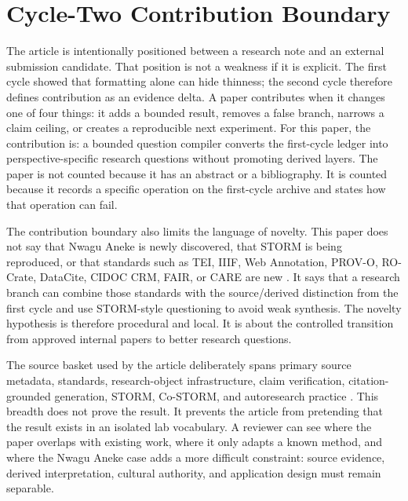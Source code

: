 \documentclass[sigconf,nonacm]{acmart}
\begin{document}
\section{Cycle-Two Contribution Boundary}
The article is intentionally positioned between a research note and an external
submission candidate. That position is not a weakness if it is explicit. The
first cycle showed that formatting alone can hide thinness; the second cycle
therefore defines contribution as an evidence delta. A paper contributes when it
changes one of four things: it adds a bounded result, removes a false branch,
narrows a claim ceiling, or creates a reproducible next experiment. For this
paper, the contribution is: a bounded question compiler converts the first-cycle ledger into perspective-specific research questions without promoting derived layers. The paper is not counted because it has an
abstract or a bibliography. It is counted because it records a specific
operation on the first-cycle archive and states how that operation can fail.

The contribution boundary also limits the language of novelty. This paper does
not say that Nwagu Aneke is newly discovered, that STORM is being reproduced, or
that standards such as TEI, IIIF, Web Annotation, PROV-O, RO-Crate, DataCite,
CIDOC CRM, FAIR, or CARE are new \cite{teiP5Glyphs,iiifPresentation3,w3cAnnotationModel,w3cAnnotationVocab,w3cProvO,rocrate12,cidocCrm,datacite45,wilkinson2016fair,carroll2020care}. It says that a research
branch can combine those standards with the source/derived distinction from the
first cycle and use STORM-style questioning to avoid weak synthesis. The novelty
hypothesis is therefore procedural and local. It is about the controlled
transition from approved internal papers to better research questions.

The source basket used by the article deliberately spans primary source
metadata, standards, research-object infrastructure, claim verification,
citation-grounded generation, STORM, Co-STORM, and autoresearch practice
\cite{azuonye1992,omniglotNwagu,unicodeAfricanScripts2023,scriptSourceNwagu,sirisNwaguProposal,teiP5Glyphs,iiifPresentation3,w3cAnnotationModel,w3cAnnotationVocab,w3cProvO,rocrate12,cidocCrm,datacite45,wilkinson2016fair,carroll2020care,wadden2020scifact,gao2023alce,karpathyAutoresearch,shao2024storm,jiang2024costorm,acmSubmissions,arxivSubmitTex}. This breadth does not prove the result. It prevents the article
from pretending that the result exists in an isolated lab vocabulary. A
reviewer can see where the paper overlaps with existing work, where it only
adapts a known method, and where the Nwagu Aneke case adds a more difficult
constraint: source evidence, derived interpretation, cultural authority, and
application design must remain separable.
\end{document}
